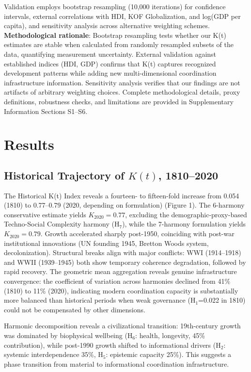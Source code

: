 \documentclass[11pt,letterpaper]{article}
\begin{document}
Validation employs bootstrap resampling (10,000 iterations) for confidence intervals, external correlations with HDI, KOF Globalization, and log(GDP per capita), and sensitivity analysis across alternative weighting schemes. \textbf{Methodological rationale}: Bootstrap resampling tests whether our K(t) estimates are stable when calculated from randomly resampled subsets of the data, quantifying measurement uncertainty. External validation against established indices (HDI, GDP) confirms that K(t) captures recognized development patterns while adding new multi-dimensional coordination infrastructure information. Sensitivity analysis verifies that our findings are not artifacts of arbitrary weighting choices. Complete methodological details, proxy definitions, robustness checks, and limitations are provided in Supplementary Information Sections S1--S6.

\section{Results}

\subsection{Historical Trajectory of $K(t)$, 1810--2020}

The Historical K(t) Index reveals a fourteen- to fifteen-fold increase from 0.054 (1810) to 0.77--0.79 (2020, depending on formulation) (Figure 1). The 6-harmony conservative estimate yields $K_{2020}=0.77$, excluding the demographic-proxy-based Techno-Social Complexity harmony (H$_7$), while the 7-harmony formulation yields $K_{2020}=0.79$. Growth accelerated sharply post-1950, coinciding with post-war institutional innovations (UN founding 1945, Bretton Woods system, decolonization). Structural breaks align with major conflicts: WWI (1914--1918) and WWII (1939--1945) both show temporary coherence degradation, followed by rapid recovery. The geometric mean aggregation reveals genuine infrastructure convergence: the coefficient of variation across harmonies declined from 41\% (1810) to 11\% (2020), indicating modern coordination capacity is substantially more balanced than historical periods when weak governance (H$_1$=0.022 in 1810) could not be compensated by other dimensions.

Harmonic decomposition reveals a civilizational transition: 19th-century growth was dominated by biophysical wellbeing (H$_6$: health, longevity, 45\% contribution), while post-1990 growth shifted to informational drivers (H$_2$: systemic interdependence 35\%, H$_5$: epistemic capacity 25\%). This suggests a phase transition from material to informational coordination infrastructure.
\end{document}
